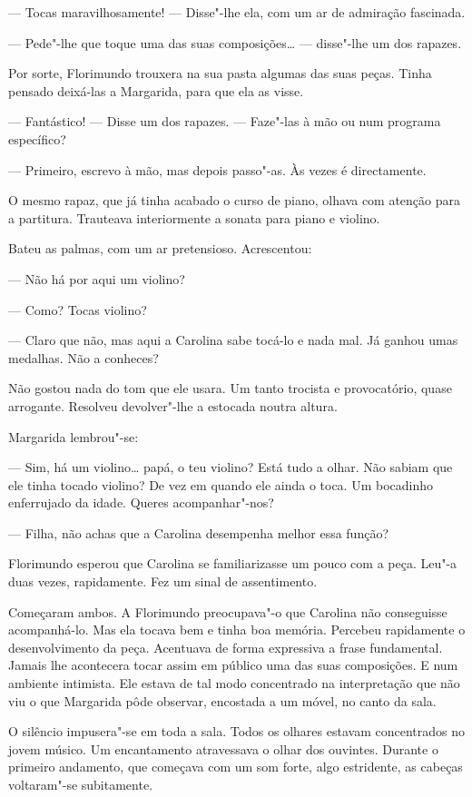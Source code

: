--- Tocas maravilhosamente! --- Disse"-lhe ela, com um ar de admiração
fascinada.

--- Pede"-lhe que toque uma das suas composições\ldots{} --- disse"-lhe um dos
rapazes.

Por sorte, Florimundo trouxera na sua pasta algumas das suas peças.
Tinha pensado deixá-las a Margarida, para que ela as visse.

--- Fantástico! --- Disse um dos rapazes. --- Faze"-las à mão ou num programa
específico?

--- Primeiro, escrevo à mão, mas depois passo"-as. Às vezes é directamente.

O mesmo rapaz, que já tinha acabado o curso de piano, olhava com atenção
para a partitura. Trauteava interiormente a sonata para piano e violino.

Bateu as palmas, com um ar pretensioso. Acrescentou:

--- Não há por aqui um violino?

--- Como? Tocas violino?

--- Claro que não, mas aqui a Carolina sabe tocá-lo e nada mal. Já ganhou
umas medalhas. Não a conheces?

Não gostou nada do tom que ele usara. Um tanto trocista e provocatório,
quase arrogante. Resolveu devolver"-lhe a estocada noutra altura.

Margarida lembrou"-se:

--- Sim, há um violino\ldots{} papá, o teu violino? Está tudo a olhar. Não
sabiam que ele tinha tocado violino? De vez em quando ele ainda o toca.
Um bocadinho enferrujado da idade. Queres acompanhar"-nos?

--- Filha, não achas que a Carolina desempenha melhor essa função?

Florimundo esperou que Carolina se familiarizasse um pouco com a peça.
Leu"-a duas vezes, rapidamente. Fez um sinal de assentimento.

Começaram ambos. A Florimundo preocupava"-o que Carolina não conseguisse
acompanhá-lo. Mas ela tocava bem e tinha boa memória. Percebeu
rapidamente o desenvolvimento da peça. Acentuava de forma expressiva a
frase fundamental. Jamais lhe acontecera tocar assim em público uma das
suas composições. E num ambiente intimista. Ele estava de tal modo
concentrado na interpretação que não viu o que Margarida pôde observar,
encostada a um móvel, no canto da sala.

O silêncio impusera"-se em toda a sala. Todos os olhares estavam
concentrados no jovem músico. Um encantamento atravessava o olhar dos
ouvintes. Durante o primeiro andamento, que começava com um som forte,
algo estridente, as cabeças voltaram"-se subitamente.

